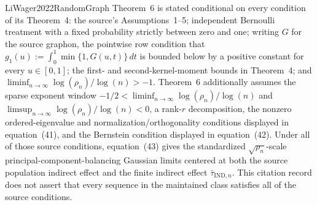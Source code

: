 LiWager2022RandomGraph Theorem~6 is stated conditional on every condition of its Theorem~4: the source's Assumptions~1--5; independent Bernoulli treatment with a fixed probability strictly between zero and one; writing \(G\) for the source graphon, the pointwise row condition that \(g_1(u):=\int_0^1\min\{1,G(u,t)\}\,dt\) is bounded below by a positive constant for every \(u\in[0,1]\); the first- and second-kernel-moment bounds in Theorem~4; and \(\liminf_{n\to\infty}\log(\rho_n)/\log(n)>-1\). Theorem~6 additionally assumes the sparse exponent window \(-1/2<\liminf_{n\to\infty}\log(\rho_n)/\log(n)\) and \(\limsup_{n\to\infty}\log(\rho_n)/\log(n)<0\), a rank-\(r\) decomposition, the nonzero ordered-eigenvalue and normalization/orthogonality conditions displayed in equation~(41), and the Bernstein condition displayed in equation~(42). Under all of those source conditions, equation~(43) gives the standardized \(\sqrt{\rho_n}\)-scale principal-component-balancing Gaussian limits centered at both the source population indirect effect and the finite indirect effect \(\bar\tau_{\mathrm{IND},n}\). This citation record does not assert that every sequence in the maintained class satisfies all of the source conditions.